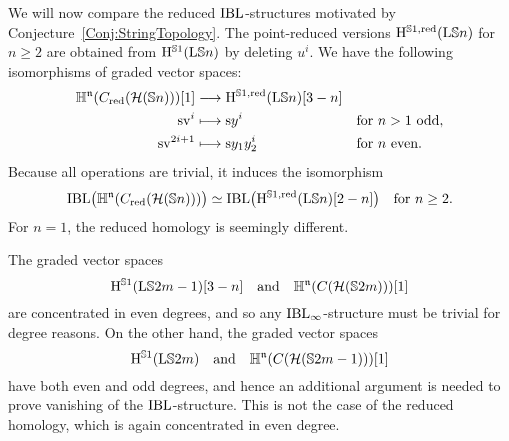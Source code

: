 \documentclass[\MainFolder/Text.tex]{subfiles}
\begin{document}
We will now compare the reduced $\mathrm{IBL}$-structures motivated by Conjecture~\ref{Conj:StringTopology}. The point-reduced versions $\mathrm{H}^{\mathbb{S}{1}, \mathrm{red}}(\mathrm{L} \mathbb{S}{n})$ for $n\ge 2$ are obtained from $\mathrm{H}^{\mathbb{S}{1}}(\mathrm{L} \mathbb{S}{n})$ by deleting $u^i$. We have the following isomorphisms of graded vector spaces:
$$ \begin{aligned}
  \mathbb{H}^{\mathfrak{n}}(C_{\mathrm{red}}(\mathcal{H}(\mathbb{S}{n})))[1] &\longrightarrow  \mathrm{H}^{\mathbb{S}{1}, \mathrm{red}}(\mathrm{L} \mathbb{S}{n})[3-n] && \\ 
       \mathrm{s} \mathrm{v}^i &\longmapsto \mathrm{s} y^i  &&\text{for }n> 1\text{ odd}, \\  
    \mathrm{s} \mathrm{v}^{2i+1} &\longmapsto \mathrm{s} y_1 y_2^i  &&\text{for }n\text{ even}.
  \end{aligned}$$
Because all operations are trivial, it induces the isomorphism
$$ \mathrm{IBL}\bigl(\mathbb{H}^{\mathfrak{n}}(C_{\mathrm{red}}(\mathcal{H}(\mathbb{S}{n})))\bigr) \simeq \mathrm{IBL}\bigl(\mathrm{H}^{\mathbb{S}{1}, \mathrm{red}}(\mathrm{L} \mathbb{S}{n})[2-n]\bigr) \quad\text{for }n\ge 2. $$
For $n = 1$, the reduced homology is seemingly different.

\begin{Remark}\label{Rem:DegRes}
%
The graded vector spaces 
$$ \mathrm{H}^{\mathbb{S}{1}}(\mathrm{L} \mathbb{S}{2m-1})[3-n]\quad\text{and}\quad\mathbb{H}^{\mathfrak{n}}(C(\mathcal{H}(\mathbb{S}{2m})))[1] $$
are concentrated in even degrees, and so any $\mathrm{IBL}_\infty$-structure must be trivial for degree reasons. On the other hand, the graded vector spaces 
$$ \mathrm{H}^{\mathbb{S}{1}}(\mathrm{L} \mathbb{S}{2m})\quad\text{and}\quad\mathbb{H}^{\mathfrak{n}}(C (\mathcal{H}(\mathbb{S}{2m-1})))[1] $$
have both even and odd degrees, and hence an additional argument is needed to prove vanishing of the $\mathrm{IBL}$-structure. This is not the case of the reduced homology, which is again concentrated in even degree.\qedhere

\end{Remark}
\end{document}
